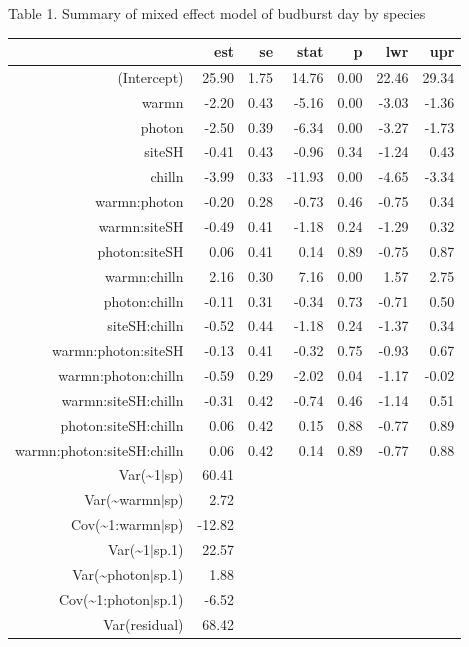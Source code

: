 \documentclass[11pt]{article}
\begin{document}
Table 1. Summary of mixed effect model of budburst day by species

\begin{table}[ht]
\centering
\begin{tabular}{rrrrrrr}
  \hline
 & est & se & stat & p & lwr & upr \\ 
  \hline
(Intercept) & 25.90 & 1.75 & 14.76 & 0.00 & 22.46 & 29.34 \\ 
  warmn & -2.20 & 0.43 & -5.16 & 0.00 & -3.03 & -1.36 \\ 
  photon & -2.50 & 0.39 & -6.34 & 0.00 & -3.27 & -1.73 \\ 
  siteSH & -0.41 & 0.43 & -0.96 & 0.34 & -1.24 & 0.43 \\ 
  chilln & -3.99 & 0.33 & -11.93 & 0.00 & -4.65 & -3.34 \\ 
  warmn:photon & -0.20 & 0.28 & -0.73 & 0.46 & -0.75 & 0.34 \\ 
  warmn:siteSH & -0.49 & 0.41 & -1.18 & 0.24 & -1.29 & 0.32 \\ 
  photon:siteSH & 0.06 & 0.41 & 0.14 & 0.89 & -0.75 & 0.87 \\ 
  warmn:chilln & 2.16 & 0.30 & 7.16 & 0.00 & 1.57 & 2.75 \\ 
  photon:chilln & -0.11 & 0.31 & -0.34 & 0.73 & -0.71 & 0.50 \\ 
  siteSH:chilln & -0.52 & 0.44 & -1.18 & 0.24 & -1.37 & 0.34 \\ 
  warmn:photon:siteSH & -0.13 & 0.41 & -0.32 & 0.75 & -0.93 & 0.67 \\ 
  warmn:photon:chilln & -0.59 & 0.29 & -2.02 & 0.04 & -1.17 & -0.02 \\ 
  warmn:siteSH:chilln & -0.31 & 0.42 & -0.74 & 0.46 & -1.14 & 0.51 \\ 
  photon:siteSH:chilln & 0.06 & 0.42 & 0.15 & 0.88 & -0.77 & 0.89 \\ 
  warmn:photon:siteSH:chilln & 0.06 & 0.42 & 0.14 & 0.89 & -0.77 & 0.88 \\ 
           Var(\~{}1$|$sp) & 60.41 &  &  &  &  &  \\ 
       Var(\~{}warmn$|$sp) & 2.72 &  &  &  &  &  \\ 
     Cov(\~{}1:warmn$|$sp) & -12.82 &  &  &  &  &  \\ 
         Var(\~{}1$|$sp.1) & 22.57 &  &  &  &  &  \\ 
    Var(\~{}photon$|$sp.1) & 1.88 &  &  &  &  &  \\ 
  Cov(\~{}1:photon$|$sp.1) & -6.52 &  &  &  &  &  \\ 
        Var(residual) & 68.42 &  &  &  &  &  \\ 
   \hline
\end{tabular}
\end{table}
\end{document}
